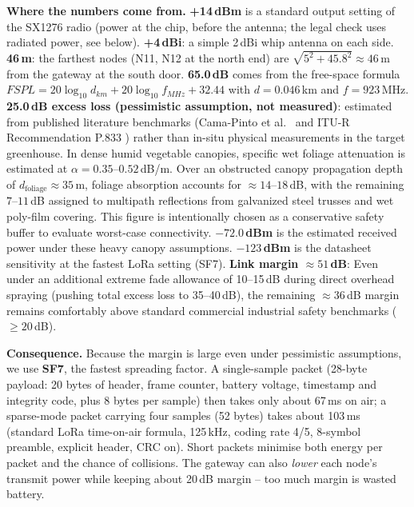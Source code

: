 \documentclass[11pt,a4paper]{report}
\newcommand{\why}[1]{\par\noindent\colorbox{gray!10}{\parbox{\dimexpr\linewidth-2\fboxsep}{\small\textbf{Where the numbers come from.} #1}}\par}
\begin{document}
\why{
\textbf{+14\,dBm} is a standard output setting of the SX1276 radio (power at the chip, before the antenna; the legal check uses radiated power, see below).
\textbf{+4\,dBi}: a simple 2\,dBi whip antenna on each side.
\textbf{46\,m}: the farthest nodes (N11, N12 at the north end) are $\sqrt{5^2 + 45.8^2} \approx 46$\,m from the gateway at the south door.
\textbf{65.0\,dB} comes from the free-space formula $FSPL = 20\log_{10} d_{km} + 20\log_{10} f_{MHz} + 32.44$ with $d = 0.046$\,km and $f = 923$\,MHz.
\textbf{25.0\,dB excess loss (pessimistic assumption, not measured)}: estimated from published literature benchmarks (Cama-Pinto et al.\ \cite{camapinto} and ITU-R Recommendation P.833 \cite{itur}) rather than in-situ physical measurements in the target greenhouse. In dense humid vegetable canopies, specific wet foliage attenuation is estimated at $\alpha = 0.35$--$0.52$\,dB/m. Over an obstructed canopy propagation depth of $d_{\text{foliage}} \approx 35$\,m, foliage absorption accounts for $\approx 14$--$18$\,dB, with the remaining $7$--$11$\,dB assigned to multipath reflections from galvanized steel trusses and wet poly-film covering. This figure is intentionally chosen as a conservative safety buffer to evaluate worst-case connectivity.
\textbf{$-72.0$\,dBm} is the estimated received power under these heavy canopy assumptions.
\textbf{$-123$\,dBm} is the datasheet sensitivity at the fastest LoRa setting (SF7).
\textbf{Link margin $\approx 51$\,dB}: Even under an additional extreme fade allowance of 10--15\,dB during direct overhead spraying (pushing total excess loss to 35--40\,dB), the remaining $\approx 36$\,dB margin remains comfortably above standard commercial industrial safety benchmarks ($\ge 20$\,dB).
}

\textbf{Consequence.} Because the margin is large even under pessimistic assumptions, we use \textbf{SF7}, the fastest spreading factor. A single-sample packet (28-byte payload: 20 bytes of header, frame counter, battery voltage, timestamp and integrity code, plus 8 bytes per sample) then takes only about 67\,ms on air; a sparse-mode packet carrying four samples (52 bytes) takes about 103\,ms (standard LoRa time-on-air formula, 125\,kHz, coding rate 4/5, 8-symbol preamble, explicit header, CRC on). Short packets minimise both energy per packet and the chance of collisions. The gateway can also \emph{lower} each node's transmit power while keeping about 20\,dB margin -- too much margin is wasted battery.
\end{document}
